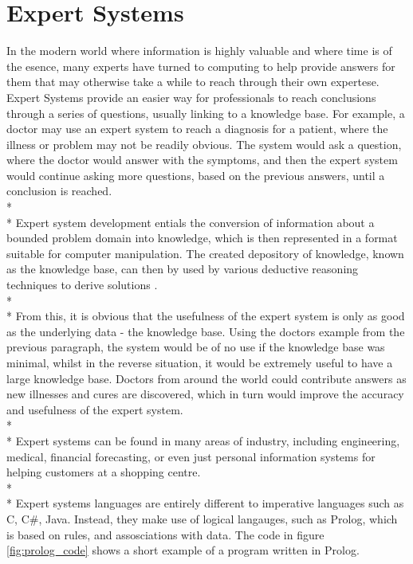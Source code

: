 \documentclass[12pt]{report}
\begin{document}
\section{Expert Systems}\label{sec:expert_systems}
In the modern world where information is highly valuable and where time is of the esence, many experts have turned to computing to help provide answers for them that may otherwise take a while to reach through their own expertese.  Expert Systems provide an easier way for professionals to reach conclusions through a series of questions, usually linking to a knowledge base.  For example, a doctor may use an expert system to reach a diagnosis for a patient, where the illness or problem may not be readily obvious.  The system would ask a question, where the doctor would answer with the symptoms, and then the expert system would continue asking more questions, based on the previous answers, until a conclusion is reached.
\\*
\\*
Expert system development entials the conversion of information about a bounded problem domain into knowledge, which is then represented in a format suitable for computer manipulation.  The created depository of knowledge, known as the knowledge base, can then by used by various deductive reasoning techniques to derive solutions \citep{expertsystems98}.
\\*
\\*
From this, it is obvious that the usefulness of the expert system is only as good as the underlying data - the knowledge base.  Using the doctors example from the previous paragraph, the system would be of no use if the knowledge base was minimal, whilst in the reverse situation, it would be extremely useful to have a large knowledge base.  Doctors from around the world could contribute answers as new illnesses and cures are discovered, which in turn would improve the accuracy and usefulness of the expert system.
\\*
\\*
Expert systems can be found in many areas of industry, including engineering, medical, financial forecasting, or even just personal information systems for helping customers at a shopping centre.
\\*
\\*
Expert systems languages are entirely different to imperative languages such as C, C\#, Java.  Instead, they make use of logical langauges, such as Prolog, which is based on rules, and assosciations with data.  The code in figure \ref{fig:prolog_code} shows a short example of a program written in Prolog.
\end{document}
